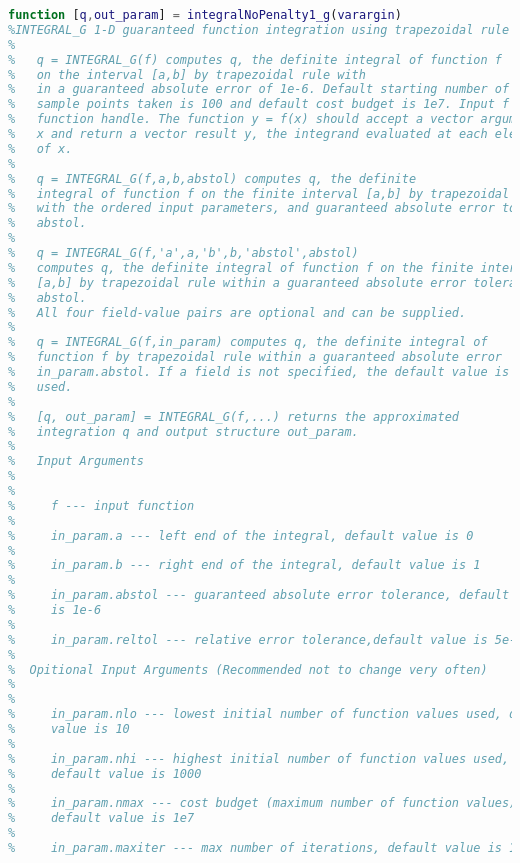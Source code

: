 \documentclass{iitthesis}
\begin{document}
\appendix



\small

\begin{lstlisting}[language=Matlab] 
function [q,out_param] = integralNoPenalty1_g(varargin)
%INTEGRAL_G 1-D guaranteed function integration using trapezoidal rule
%
%   q = INTEGRAL_G(f) computes q, the definite integral of function f
%   on the interval [a,b] by trapezoidal rule with 
%   in a guaranteed absolute error of 1e-6. Default starting number of
%   sample points taken is 100 and default cost budget is 1e7. Input f is a 
%   function handle. The function y = f(x) should accept a vector argument 
%   x and return a vector result y, the integrand evaluated at each element
%   of x.
%
%   q = INTEGRAL_G(f,a,b,abstol) computes q, the definite
%   integral of function f on the finite interval [a,b] by trapezoidal rule
%   with the ordered input parameters, and guaranteed absolute error tolerance
%   abstol.
%
%   q = INTEGRAL_G(f,'a',a,'b',b,'abstol',abstol)
%   computes q, the definite integral of function f on the finite interval
%   [a,b] by trapezoidal rule within a guaranteed absolute error tolerance
%   abstol.
%   All four field-value pairs are optional and can be supplied.
%
%   q = INTEGRAL_G(f,in_param) computes q, the definite integral of
%   function f by trapezoidal rule within a guaranteed absolute error
%   in_param.abstol. If a field is not specified, the default value is
%   used.
%
%   [q, out_param] = INTEGRAL_G(f,...) returns the approximated 
%   integration q and output structure out_param.
%
%   Input Arguments
%
%
%     f --- input function
%
%     in_param.a --- left end of the integral, default value is 0
%
%     in_param.b --- right end of the integral, default value is 1
%
%     in_param.abstol --- guaranteed absolute error tolerance, default value
%     is 1e-6
%
%     in_param.reltol --- relative error tolerance,default value is 5e-3
%
%  Opitional Input Arguments (Recommended not to change very often) 
%
%
%     in_param.nlo --- lowest initial number of function values used, default
%     value is 10
%
%     in_param.nhi --- highest initial number of function values used,
%     default value is 1000
%
%     in_param.nmax --- cost budget (maximum number of function values),
%     default value is 1e7
%
%     in_param.maxiter --- max number of iterations, default value is 1000

\end{lstlisting}
\end{document}
